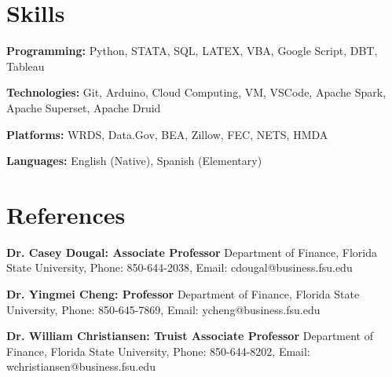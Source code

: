 \documentclass[letterpaper,11pt]{article}
\newcommand{\resumeSubHeadingListStart}{\begin{itemize}[leftmargin=0.15in, label={}]}
\newcommand{\resumeSubHeadingListEnd}{\end{itemize}}
\begin{document}
\section{Skills}
  \vspace{2pt}
  \resumeSubHeadingListStart
    \small{\item{
        \textbf{Programming:}{ Python, STATA, SQL, LATEX, VBA, Google Script, DBT, Tableau} \\ \vspace{3pt}
        
        \textbf{Technologies:}{ Git, Arduino, Cloud Computing, VM, VSCode, Apache Spark, Apache Superset, Apache Druid} \\ \vspace{3pt}

        \textbf{Platforms:}{ WRDS, Data.Gov, BEA, Zillow, FEC, NETS, HMDA} \\ \vspace{3pt}
        
        \textbf{Languages:}{ English (Native), Spanish (Elementary)}
        
    }}
  \resumeSubHeadingListEnd




\section{References}
  \vspace{2pt}
  \resumeSubHeadingListStart
    \small{\item{
        \textbf{Dr. Casey Dougal: Associate Professor}{ Department of Finance, Florida State University, Phone: 850-644-2038, Email: cdougal@business.fsu.edu} \\ \vspace{3pt}

        \textbf{Dr. Yingmei Cheng: Professor}{ Department of Finance, Florida State University, Phone: 850-645-7869, Email:  ycheng@business.fsu.edu} \\ \vspace{3pt}

        \textbf{Dr. William Christiansen: Truist Associate Professor}{ Department of Finance, Florida State University, Phone: 850-644-8202, Email:   wchristiansen@business.fsu.edu} \\ \vspace{3pt}

    }}
  \resumeSubHeadingListEnd
\end{document}
